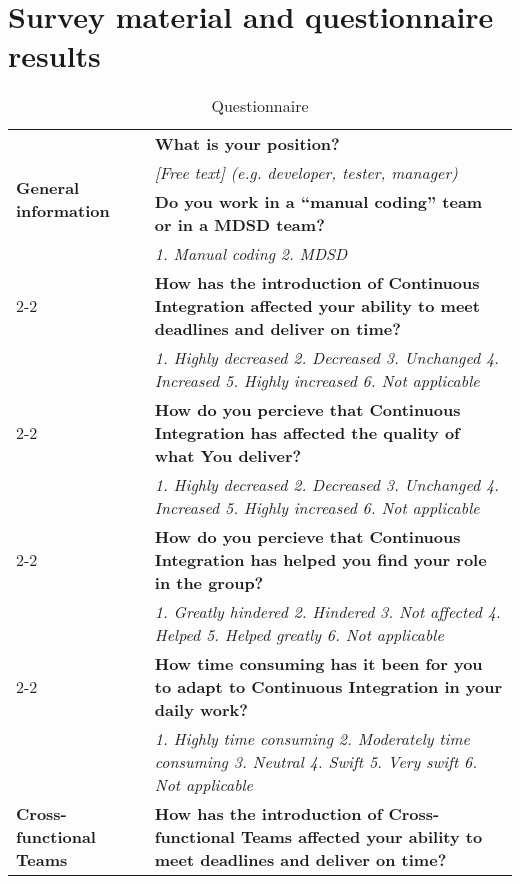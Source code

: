 \documentclass[final_report_innit.tex]{subfiles}
\begin{document}
\section{Survey material and questionnaire results}\label{appendixSurvey}
\begin{center}
\begin{table}[h]
\caption{Questionnaire}
\begin{tabular}[t]{| p{4.5cm} | p{13cm} |}
	\hline
	\multirow{4}{*}{\textbf{General information}} & \cellcolor{greyOdd}\textbf{What is your position?} \\
	& \textit{[Free text] (e.g. developer, tester, manager)} \\ \cline{2-2}
	& \cellcolor{greyOdd}\textbf{Do you work in a ``manual coding'' team or in a MDSD team?} \\
	& \textit{1. Manual coding 2. MDSD} \\ \cline{2-2}
	\hline
	\multirow{9}{*}{\textbf{Continuous Integration}} & \cellcolor{greyOdd}\textbf{How has the introduction of Continuous Integration affected your ability to meet deadlines and deliver on time?} \\ 
	& \textit{1. Highly decreased 2. Decreased 3. Unchanged 4. Increased 5. Highly increased 6. Not applicable} \\ \cline{2-2}
	& \cellcolor{greyOdd}\textbf{How do you percieve that Continuous Integration has affected the quality of what You deliver?} \\
	& \textit{1. Highly decreased 2. Decreased 3. Unchanged 4. Increased 5. Highly increased 6. Not applicable} \\ \cline{2-2}
	& \cellcolor{greyOdd}\textbf{How do you percieve that Continuous Integration has helped you find your role in the group?} \\
	& \textit{1. Greatly hindered 2. Hindered 3. Not affected 4. Helped 5. Helped greatly 6. Not applicable} \\ \cline{2-2}
	& \cellcolor{greyOdd}\textbf{How time consuming has it been for you to adapt to Continuous Integration in your daily work?} \\
	& \textit{1. Highly time consuming 2. Moderately time consuming 3. Neutral 4. Swift 5. Very swift 6. Not applicable} \\
	\hline
	\multirow{9}{*}{\textbf{Cross-functional Teams}} & \cellcolor{greyOdd}\textbf{How has the introduction of Cross-functional Teams affected your ability to meet deadlines and deliver on time?} \\ 

\end{tabular}
\end{table}
\end{center}
\end{document}
